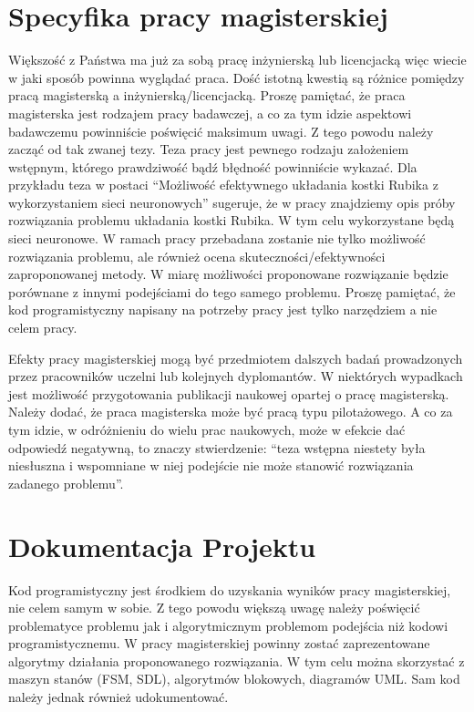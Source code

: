 \documentclass[12pt,a4paper]{article}
\begin{document}
\section{Specyfika pracy magisterskiej}
Większość z Państwa ma już za sobą pracę inżynierską lub licencjacką więc wiecie w jaki sposób powinna wyglądać praca. Dość istotną kwestią są różnice pomiędzy pracą magisterską a inżynierską/licencjacką. Proszę pamiętać, że praca magisterska jest rodzajem pracy badawczej, a co za tym idzie aspektowi badawczemu powinniście poświęcić maksimum uwagi. Z tego powodu należy zacząć od tak zwanej tezy. Teza pracy jest pewnego rodzaju założeniem wstępnym, którego prawdziwość bądź błędność powinniście wykazać. Dla przykładu teza w postaci ``Możliwość efektywnego układania kostki Rubika z wykorzystaniem sieci neuronowych'' sugeruje, że w pracy znajdziemy opis próby rozwiązania problemu układania kostki Rubika. W tym celu wykorzystane będą sieci neuronowe. W ramach pracy przebadana zostanie nie tylko możliwość rozwiązania problemu, ale również ocena skuteczności/efektywności zaproponowanej metody. W miarę możliwości proponowane rozwiązanie będzie porównane z innymi podejściami do tego samego problemu. Proszę pamiętać, że kod programistyczny napisany na potrzeby pracy jest tylko narzędziem a nie celem pracy.

Efekty pracy magisterskiej mogą być przedmiotem dalszych badań prowadzonych przez pracowników uczelni lub kolejnych dyplomantów. W niektórych wypadkach jest możliwość przygotowania publikacji naukowej opartej o pracę magisterską. Należy dodać, że praca magisterska może być pracą typu pilotażowego. A co za tym idzie, w odróżnieniu do wielu prac naukowych, może w efekcie dać odpowiedź negatywną, to znaczy stwierdzenie: ``teza wstępna niestety była niesłuszna i wspomniane w niej podejście nie może stanowić rozwiązania zadanego problemu''.

\section{Dokumentacja Projektu}\label{dokumentacja}

Kod programistyczny jest środkiem do uzyskania wyników pracy magisterskiej, nie celem samym w sobie. Z tego powodu większą uwagę należy poświęcić problematyce problemu jak i algorytmicznym problemom podejścia niż kodowi programistycznemu. W pracy magisterskiej powinny zostać zaprezentowane algorytmy działania proponowanego rozwiązania. W tym celu można skorzystać z maszyn stanów (FSM, SDL), algorytmów blokowych, diagramów UML. Sam kod należy jednak również udokumentować.
\end{document}
